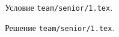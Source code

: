 \problem{}
Условие \texttt{team/senior/1.tex}.

\solution Решение \texttt{team/senior/1.tex}.
\endproblem
